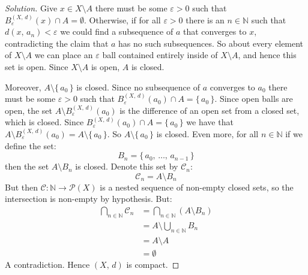 \documentclass{article}
\theoremstyle{normal}
\begin{document}
\begin{proof}[Solution]
        Give $x\in{X}\setminus{A}$ there must be some $\varepsilon>0$ such
        that $B_{\varepsilon}^{(X,\,d)}(x)\cap{A}=\emptyset$. Otherwise, if for
        all $\varepsilon>0$ there is an $n\in\mathbb{N}$ such that
        $d(x,\,a_{n})<\varepsilon$ we could find a subsequence of $a$ that
        converges to $x$, contradicting the claim that $a$ has no such
        subsequences. So about every element of $X\setminus{A}$ we can place an
        $\varepsilon$ ball contained entirely inside of $X\setminus{A}$, and
        hence this set is open. Since $X\setminus{A}$ is open, $A$ is closed.
        \par\hfill\par
        Moreover, $A\setminus\{\,a_{0}\,\}$ is closed. Since no subsequence
        of $a$ converges to $a_{0}$ there must be some
        $\varepsilon>0$ such that
        $B_{\varepsilon}^{(X,\,d)}(a_{0})\cap{A}=\{\,a_{0}\,\}$.
        Since open balls are open, the set
        $A\setminus{B}_{\varepsilon}^{(X,\,d)}(a_{0})$ is the difference of an
        open set from a closed set, which is closed.
        Since $B_{\varepsilon}^{(X,\,d)}(a_{0})\cap{A}=\{\,a_{0}\,\}$ we have
        that
        $A\setminus{B}_{\varepsilon}^{(X,\,d)}(a_{0})=A\setminus\{\,a_{0}\,\}$.
        So $A\setminus\{\,a_{0}\,\}$ is closed. Even more, for all
        $n\in\mathbb{N}$ if we define the set:
        \begin{equation}
            B_{n}=\{\,a_{0},\,\dots,\,a_{n-1}\,\}
        \end{equation}
        then the set $A\setminus{B}_{n}$ is closed.
        Denote this set by $\mathcal{C}_{n}$:
        \begin{equation}
            \mathcal{C}_{n}=A\setminus{B}_{n}
        \end{equation}
        But then
        $\mathcal{C}:\mathbb{N}\rightarrow\mathcal{P}(X)$ is a nested sequence
        of non-empty closed sets, so the intersection is non-empty by
        hypothesis. But:
        \begin{align}
            \bigcap_{n\in\mathbb{N}}\mathcal{C}_{n}
            &=\bigcap_{n\in\mathbb{N}}(A\setminus{B}_{n})\\
            &=A\setminus\bigcup_{n\in\mathbb{N}}B_{n}\\
            &=A\setminus{A}\\
            &=\emptyset
        \end{align}
        A contradiction. Hence $(X,\,d)$ is compact.
        \par\hfill\par

\end{proof}
\end{document}
